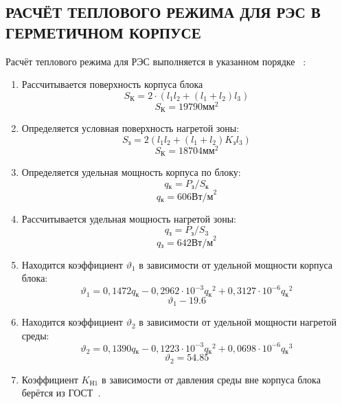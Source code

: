 \subsection{РАСЧЁТ ТЕПЛОВОГО РЕЖИМА ДЛЯ РЭС В ГЕРМЕТИЧНОМ КОРПУСЕ}
Расчёт теплового режима для РЭС выполняется в указанном порядке ~\cite{Rotkop1976}:
\begin{enumerate}
  
\item Рассчитывается поверхность корпуса блока
%
  \begin{equation}
    S\mathrm{_{К}} = 2 \cdot (l_1 l_2 + (l_1+ l_2)l_3) %
  \end{equation}
%
  $$ S\mathrm{_{К}} = 19790 \text{мм}^2 $$
\item Определяется условная поверхность нагретой зоны:
  \begin{equation}
    S\mathrm{_{з}} = 2 (l_1 l_2 + (l_1 + l_2) K\mathrm{_{з}} l_3 ) %
  \end{equation}
%
    $$ S\mathrm{_{К}} = 18704 \text{мм}^2 $$
\item Определяется удельная мощность корпуса по блоку:
%
\begin{equation}
  q\mathrm{_к} = P\mathrm{_з}/S\mathrm{_к} %
\end{equation}
%
$$q\mathrm{_к} = 606 \text{Вт/м}^2 $$
%
\item Рассчитывается удельная мощность нагретой зоны:
  \begin{equation}
      q\mathrm{_з} = P\mathrm{_з}/S\mathrm{_3} %
    \end{equation}
$$q\mathrm{_з} = 642 \text{Вт/м}^2 $$
%
\item Находится коэффициент $\vartheta_1$ в зависимости от удельной мощности корпуса блока:
\begin{equation}
\vartheta_1 = 0,1472q\mathrm{_к} - 0,2962 \cdot 10^{-3}q\mathrm{_к}^2 + 0,3127 \cdot 10^{-6}q\mathrm{_к}^2
\end{equation}
%
$$\vartheta_1 -19.6$$
\item Находится коэффициент $\vartheta_2$ в зависимости от удельной мощности нагретой среды:
%
\begin{equation}
\vartheta_2 = 0,1390q\mathrm{_к} - 0,1223 \cdot 10^{-3}q\mathrm{_к}^2 + 0,0698 \cdot 10^{-6}q\mathrm{_к}^3
\end{equation}
%
$$\vartheta_2 = 54.85$$
%
\item Коэффициент $K\mathrm{_{Н1}}$ в зависимости от давления
  среды вне корпуса блока берётся из ГОСТ~\cite{GOST-15150-69}.

\end{enumerate}
